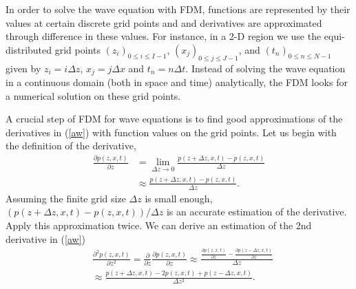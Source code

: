 \documentclass[11pt]{article}
\theoremstyle{plain}
\theoremstyle{definition}
\theoremstyle{remark}
\numberwithin{equation}{section}
\begin{document}
In order to solve the wave equation with FDM, functions are represented by their values at certain discrete grid points and and derivatives are approximated through difference in these values. For instance, in a 2-D region we use the equi-distributed grid points $(z_i)_{0\le i \le I-1 }$, $(x_j)_{0\le j \le J-1}$, and $(t_n)_{0\le n \le N-1}$ given by $z_i = i\Delta z$, $x_j = j\Delta x$ and $t_n=n\Delta t$. Instead of solving the wave equation in a continuous domain (both in space and time) analytically, the FDM looks for a numerical solution on these grid points.  

A crucial step of FDM for wave equations is to find good approximations of the derivatives in (\ref{aw}) with function values on the grid points. Let us begin with the definition of the derivative, 
 \begin{equation}
  \begin{aligned}
  \frac{\partial p(z, x, t)}{\partial z} &= \lim\limits_{\Delta z \rightarrow 0} \frac{p(z+\Delta z, x, t) - p(z, x, t)}{\Delta z}\\
  &\approx \frac{p(z+\Delta z, x, t) - p(z, x, t)}{\Delta z}.
  \end{aligned}
  \end{equation}
 Assuming the finite grid size $\Delta z$ is small enough, $(p(z+\Delta z, x, t) - p(z, x, t))/\Delta z$ is an accurate estimation of the derivative.
  Apply this approximation twice. We can derive an estimation of the 2nd derivative in (\ref{aw})
  \begin{equation}
  \begin{aligned}
  &\frac{\partial^2 p(z, x, t)}{\partial z^2} = \frac{\partial}{\partial z}\frac{\partial p(z, x, t)}{\partial z} \approx \frac{\frac{\partial p(z, x, t)}{\partial z} - \frac{\partial p(z-\Delta z, x, t)}{\partial z}}{\Delta z}\\
  &\approx \frac{p(z+\Delta z, x, t) - 2p(z, x, t) + p(z-\Delta z, x, t)}{\Delta z^2}.
  \end{aligned}
  \end{equation}
  
\end{document}
